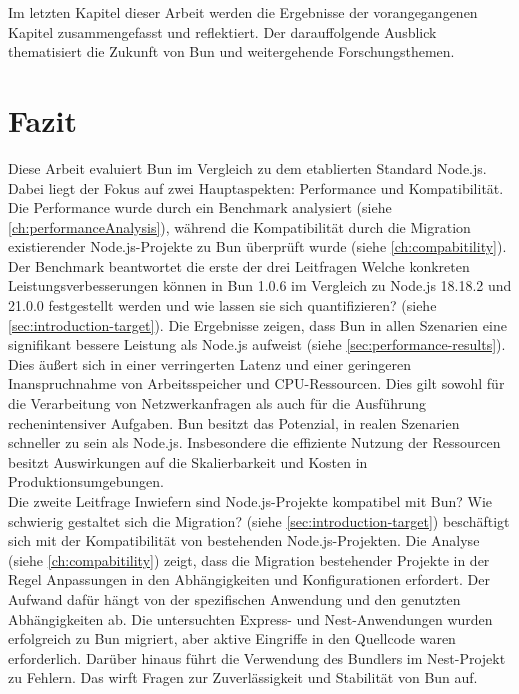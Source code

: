  \label{ch:finalThoughts}
Im letzten Kapitel dieser Arbeit werden die Ergebnisse der vorangegangenen Kapitel zusammengefasst und reflektiert. Der darauffolgende Ausblick thematisiert die Zukunft von Bun und weitergehende Forschungsthemen.

\section{Fazit} \label{sec:finalThoughts-conclusion}
Diese Arbeit evaluiert Bun im Vergleich zu dem etablierten Standard Node.js. Dabei liegt der Fokus auf zwei Hauptaspekten: Performance und Kompatibilität. Die Performance wurde durch ein Benchmark analysiert (siehe \autoref{ch:performanceAnalysis}), während die Kompatibilität durch die Migration existierender Node.js-Projekte zu Bun überprüft wurde (siehe \autoref{ch:compabitility}).\\

\noindent
Der Benchmark beantwortet die erste der drei Leitfragen \glqq Welche konkreten Leistungsverbesserungen können in Bun 1.0.6 im Vergleich zu Node.js 18.18.2 und 21.0.0 festgestellt werden und wie lassen sie sich quantifizieren?\grqq{} (siehe \autoref{sec:introduction-target}). Die Ergebnisse zeigen, dass Bun in allen Szenarien eine signifikant bessere Leistung als Node.js aufweist (siehe \autoref{sec:performance-results}). Dies äußert sich in einer verringerten Latenz und einer geringeren Inanspruchnahme von Arbeitsspeicher und CPU-Ressourcen. Dies gilt sowohl für die Verarbeitung von Netzwerkanfragen als auch für die Ausführung rechenintensiver Aufgaben. Bun besitzt das Potenzial, in realen Szenarien schneller zu sein als Node.js. Insbesondere die effiziente Nutzung der Ressourcen besitzt Auswirkungen auf die Skalierbarkeit und Kosten in Produktionsumgebungen.\\

\noindent
Die zweite Leitfrage \glqq Inwiefern sind Node.js-Projekte kompatibel mit Bun? Wie schwierig gestaltet sich die Migration?\grqq{} (siehe \autoref{sec:introduction-target}) beschäftigt sich mit der Kompatibilität von bestehenden Node.js-Projekten. Die Analyse (siehe \autoref{ch:compabitility}) zeigt, dass die Migration bestehender Projekte in der Regel Anpassungen in den Abhängigkeiten und Konfigurationen erfordert. Der Aufwand dafür hängt von der spezifischen Anwendung und den genutzten Abhängigkeiten ab. Die untersuchten Express- und Nest-Anwendungen wurden erfolgreich zu Bun migriert, aber aktive Eingriffe in den Quellcode waren erforderlich. Darüber hinaus führt die Verwendung des Bundlers im Nest-Projekt zu Fehlern. Das wirft Fragen zur Zuverlässigkeit und Stabilität von Bun auf.\\

